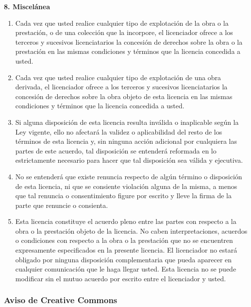         \par \textbf{8. Miscelánea}

        \begin{enumerate}
          \item Cada vez que usted realice cualquier tipo de explotación de la obra o la prestación, o de una colección que la incorpore, el licenciador ofrece a los terceros y sucesivos licenciatarios la concesión de derechos sobre la obra o la prestación en las mismas condiciones y términos que la licencia concedida a usted.

          \item Cada vez que usted realice cualquier tipo de explotación de una obra derivada, el licenciador  ofrece a los terceros y sucesivos licenciatarios la concesión de derechos sobre la obra objeto de esta licencia en las mismas condiciones y términos que la licencia concedida a usted. 

          \item Si alguna disposición de esta licencia resulta inválida o inaplicable según la Ley vigente, ello no afectará la validez o aplicabilidad del resto de los términos de esta licencia y, sin ninguna acción adicional por cualquiera las partes de este acuerdo, tal disposición se entenderá reformada en lo estrictamente necesario para hacer que tal disposición sea válida y ejecutiva.

          \item No se entenderá que existe renuncia respecto de algún término o disposición de esta licencia, ni que se consiente violación alguna de la misma, a menos que tal renuncia o consentimiento figure por escrito y lleve la firma de la parte que renuncie o consienta. 

          \item Esta licencia constituye el acuerdo pleno entre las partes con respecto a la obra o la prestación objeto de la licencia. No caben interpretaciones, acuerdos o condiciones  con respecto a la obra o la prestación que no se encuentren expresamente especificados en la presente licencia. El licenciador no estará obligado por ninguna disposición complementaria que pueda aparecer en cualquier comunicación que le haga llegar usted. Esta licencia no se puede modificar sin el mutuo acuerdo por escrito entre el licenciador y usted.
        \end{enumerate}
        
          \subsubsection*{Aviso de Creative Commons}

